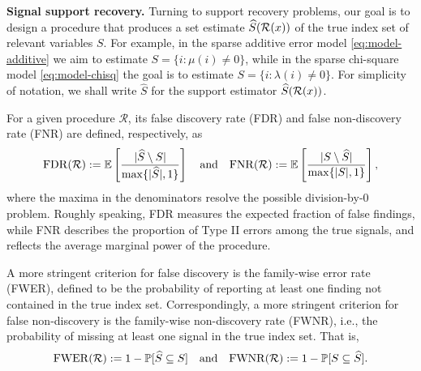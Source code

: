 \medskip

{\bf Signal support recovery.}
Turning to support recovery problems, our goal is to design a procedure that produces a set estimate $\widehat{S}({\cal R}(x))$ of the true index set of relevant variables $S$.
For example, in the sparse additive error model \eqref{eq:model-additive} we aim to estimate $S=\{i:\mu(i)\neq 0\}$, while in the sparse chi-square model \eqref{eq:model-chisq} the goal is to estimate $S=\{i:\lambda(i)\neq 0\}$.
For simplicity of notation, we shall write $\widehat{S}$ for the support estimator $\widehat{S}({\cal R}(x))$.

For a given procedure $\mathcal{R}$, its {false discovery rate} (FDR) 
and  {false non-discovery rate} (FNR) are defined, respectively, as
\begin{equation} \label{eq:FDR-FNR}
    \mathrm{FDR}(\mathcal{R}) := \E\left[\frac{|\widehat{S}\setminus S|}{\max\{|\widehat{S}|,1\}}\right]
    \quad \text{and} \quad
    \mathrm{FNR}(\mathcal{R}) := \E\left[\frac{|S\setminus \widehat{S}|}{\max\{|{S}|,1\}}\right],
\end{equation}
where the maxima in the denominators resolve the possible division-by-0 problem. 
Roughly speaking, FDR measures the expected fraction of false findings, while FNR describes the proportion of Type II errors among the true signals, and reflects the average marginal power of the procedure.

A more stringent criterion for false discovery is the family-wise error rate (\ac{FWER}), defined to be the probability of 
reporting at least one finding not contained 
in the true index set. Correspondingly, a more stringent criterion for false non-discovery is the family-wise non-discovery rate (\ac{FWNR}), i.e., the probability of missing at least one signal in the true index set. That is,
\begin{equation} \label{eq:FWER-FWNR}
    \mathrm{FWER}(\mathcal{R}) := 1 - \P[\widehat{S} \subseteq S]
    \quad \text{and} \quad
    \mathrm{FWNR}(\mathcal{R}) := 1 - \P[S \subseteq \widehat{S}].
\end{equation}

